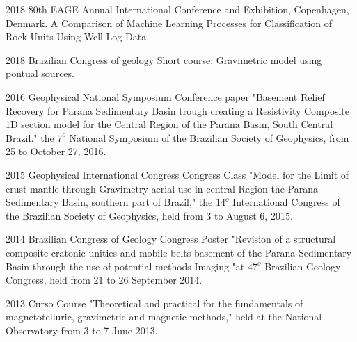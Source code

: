\documentclass{tccv}
\begin{document}
\begin{yearlist}

\item{2018}
     {80th EAGE Annual International Conference and Exhibition, Copenhagen, Denmark.}
     {A Comparison of Machine Learning Processes for Classification of Rock Units Using Well Log Data.}

\item{2018}  
     {Brazilian Congress of geology}
     {Short course: Gravimetric model using pontual sources.}
     
\item{2016}
	 {Geophysical National Symposium}
	 {Conference paper "Basement Relief Recovery for Parana Sedimentary Basin trough creating a Resistivity Composite 1D section model for the Central Region of the Parana Basin, South Central Brazil." the $ 7 ^ {o} $ National Symposium of the Brazilian Society of Geophysics, from 25 to October 27, 2016.}

\item{2015}
	 {Geophysical International Congress}
	 {Congress Class "Model for the Limit  of crust-mantle through Gravimetry aerial use in central Region the Parana Sedimentary Basin, southern part of Brazil," the $ 14 ^ {o} $ International Congress of the Brazilian Society of Geophysics, held from 3 to August 6, 2015.}
	 


\item{2014}
	 {Brazilian Congress of Geology}
	 {Congress Poster "Revision of a structural composite cratonic unities and mobile belts basement of the Parana Sedimentary Basin through the use of potential methods Imaging "at $ 47 ^ {o} $ Brazilian Geology Congress, held from 21 to 26 September 2014.}


\item{2013}
     {Curso}
     {Course "Theoretical and practical for the fundamentals of magnetotelluric, gravimetric and magnetic methods," held at the National Observatory from 3 to 7 June 2013. }


\end{yearlist}
\end{document}
